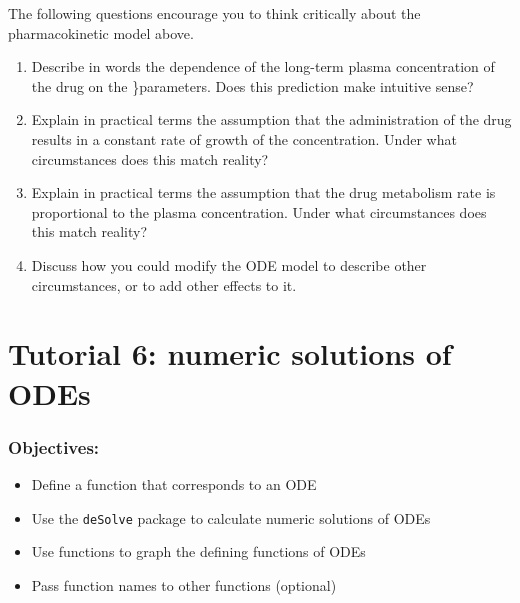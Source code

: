 \documentclass[
  letterpaper,
  DIV=11,
  numbers=noendperiod]{scrreprt}
\providecommand{\tightlist}{%
  \setlength{\itemsep}{0pt}\setlength{\parskip}{0pt}}\usepackage{longtable,booktabs,array}
\begin{document}
The following questions encourage you to think critically about the
pharmacokinetic model above.

\begin{enumerate}
\def\labelenumi{\arabic{enumi}.}
\item
  Describe in words the dependence of the long-term plasma concentration
  of the drug on the \}parameters. Does this prediction make intuitive
  sense?
\item
  Explain in practical terms the assumption that the administration of
  the drug results in a constant rate of growth of the concentration.
  Under what circumstances does this match reality?
\item
  Explain in practical terms the assumption that the drug metabolism
  rate is proportional to the plasma concentration. Under what
  circumstances does this match reality?
\item
  Discuss how you could modify the ODE model to describe other
  circumstances, or to add other effects to it.
\end{enumerate}


\hypertarget{tutorial-6-numeric-solutions-of-odes}{%
\chapter*{Tutorial 6: numeric solutions of
ODEs}\label{tutorial-6-numeric-solutions-of-odes}}


\hypertarget{objectives-1}{%
\subsection*{Objectives:}\label{objectives-1}}

\begin{itemize}
\tightlist
\item
  Define a function that corresponds to an ODE
\item
  Use the \texttt{deSolve} package to calculate numeric solutions of
  ODEs
\item
  Use functions to graph the defining functions of ODEs
\item
  Pass function names to other functions (optional)
\end{itemize}
\end{document}
